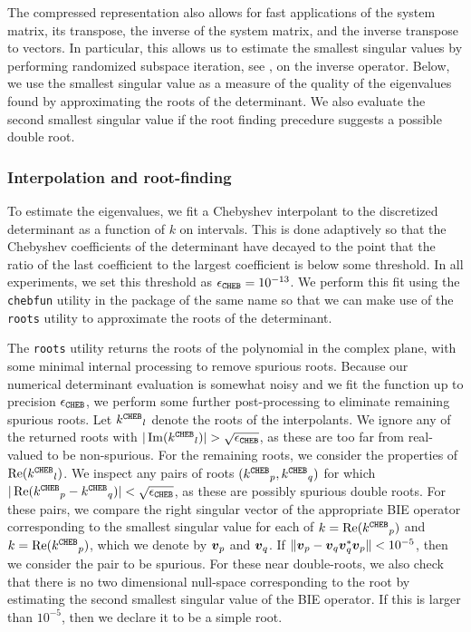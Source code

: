 The compressed representation also allows
for fast applications of the system matrix,
its transpose, the inverse of the system
matrix, and the inverse transpose to
vectors.
%
In particular, this allows us to estimate the
smallest singular values by performing
randomized subspace iteration, see
\cite[Algorithm 4.4]{halko2011finding},
on the inverse operator.
%
Below, we use the smallest singular value
as a measure of the quality of the
eigenvalues found by approximating the
roots of the determinant.
%
We also evaluate the second smallest singular
value if the root finding precedure suggests a
possible double root. 

\subsubsection{Interpolation and root-finding}

To estimate the eigenvalues, we fit a Chebyshev
interpolant to the discretized determinant as a
function of $k$ on intervals.
%
This is done adaptively so that the Chebyshev
coefficients of the determinant have decayed
to the point that the ratio of the last
coefficient to the largest coefficient is below
some threshold.
%
In all experiments, we set this threshold
as ${\epsilon_{\texttt{CHEB}}} = 10^{-13}$.
%
We perform this fit using the \texttt{chebfun}
utility in the package of the same name
\cite{driscoll2014chebfun}
so that we can make use
of the \texttt{roots} utility to approximate
the roots of the determinant.

The \texttt{roots} utility returns the roots
of the polynomial in the complex plane, with
some minimal internal processing to remove
spurious roots.
%
Because our numerical determinant evaluation
is somewhat noisy and we fit the function up to
precision ${\epsilon_{\texttt{CHEB}}}$, we perform some
further post-processing to eliminate remaining
spurious roots.
%
Let ${k^\texttt{CHEB}}_l$ denote the roots of the interpolants.
%
We ignore any of the returned roots with $|\operatorname{Im}({k^\texttt{CHEB}}_l)|
> \sqrt{{\epsilon_{\texttt{CHEB}}}}$, as these are too far from real-valued
to be non-spurious.
%
For the remaining roots, we consider the
properties of $\operatorname{Re}({k^\texttt{CHEB}}_l)$.
%
We inspect any pairs of roots $({k^\texttt{CHEB}}_p,{k^\texttt{CHEB}}_q)$
for which $|\operatorname{Re}({k^\texttt{CHEB}}_p-{k^\texttt{CHEB}}_q)| < \sqrt{{\epsilon_{\texttt{CHEB}}}}$,
as these are possibly spurious double roots.
%
For these pairs, we compare the right singular
vector of the appropriate BIE operator corresponding
to the smallest singular value for each of $k=\operatorname{Re}({k^\texttt{CHEB}}_p)$
and $k=\operatorname{Re}({k^\texttt{CHEB}}_p)$, which we denote by
${\boldsymbol v}_p$ and ${\boldsymbol v}_q$.
%
If $\|{\boldsymbol v}_p - {\boldsymbol v}_q {\boldsymbol v}_q^* {\boldsymbol v}_p \| < 10^{-5}$, then
we consider the pair to be spurious.
%
For these near double-roots, we also check
that there is no two dimensional null-space
corresponding to the root by estimating the
second smallest singular value of the BIE operator.
%
If this is larger than $10^{-5}$, then we declare
it to be a simple root.


